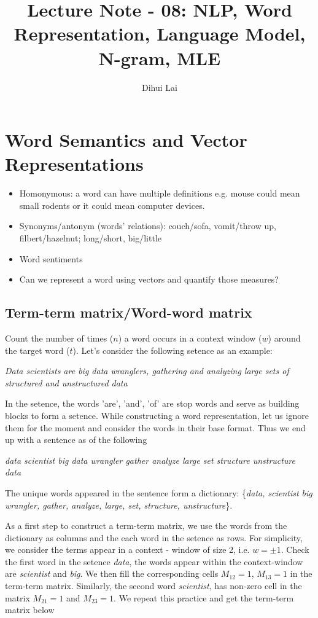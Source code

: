 \documentclass[12pt, oneside]{article}
\title{Lecture Note - 08: NLP, Word Representation, Language Model, N-gram, MLE}
\author{Dihui Lai}
\begin{document}
\maketitle
\tableofcontents

\vspace{.25in}


\section{Word Semantics and Vector Representations}
\begin{itemize} 
\item Homonymous: a word can have multiple definitions e.g. mouse could mean small rodents or it could mean computer devices. 
\item Synonyms/antonym (words' relations): couch/sofa, vomit/throw up, filbert/hazelnut; long/short, big/little
\item Word sentiments
\item Can we represent a word using vectors and quantify those measures?
\end{itemize}

\subsection{Term-term matrix/Word-word matrix}
Count the number of times ($n$) a word occurs in a context window ($w$) around the target word ($t$). Let's consider the following setence as an example:

\textit{Data scientists are big data wranglers, gathering and analyzing large sets of structured and unstructured data}

In the setence, the words 'are', 'and', 'of' are stop words and serve as building blocks to form a setence. While constructing a word representation, let us ignore them for the moment and consider the words in their base format. Thus we end up with a sentence as of the following 

\textit{data scientist big data wrangler gather analyze large set structure unstructure data}

The unique words appeared in the sentence form a dictionary: \{\textit{data, scientist big wrangler, gather, analyze, large, set, structure, unstructure}\}. 

As a first step to construct a term-term matrix, we use the words from the dictionary as columns and the each word in the setence as rows. For simplicity, we consider the terms appear in a context - window of size 2, i.e. $w=\pm 1$. Check the first word in the setence \textit{data}, the words appear within the context-window are \textit{scientist} and \textit{big}. We then fill the corresponding cells $M_{12} = 1$, $M_{13} = 1$ in the term-term matrix. Similarly, the second word \textit{scientist}, has non-zero cell in the matrix $M_{21}=1$ and $M_{23}=1$. We repeat this practice and get the term-term matrix below
\end{document}
